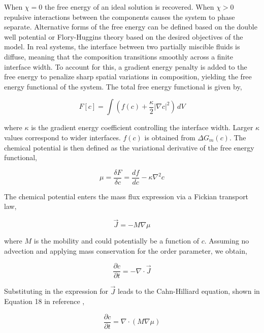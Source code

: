When $\chi = 0$ the free energy of an ideal solution is recovered. When $\chi > 0$ repulsive interactions between the components 
causes the system to phase separate. Alternative forms of the free energy can be defined based on the double well potential or
Flory-Huggins theory based on the desired objectives of the model. In real systems, the interface between two partially miscible fluids is 
diffuse, meaning that the composition transitions smoothly across a finite interface width. To account for this, a gradient energy penalty is 
added to the free energy to penalize sharp spatial variations in composition, yielding the free energy functional of the system. 
The total free energy functional is given by,

\begin{equation}
    F[c] = \int \left( f(c) + \frac{\kappa}{2}|\nabla c|^2 \right) \, dV
\end{equation}

where $\kappa$ is the gradient energy coefficient controlling the interface width. Larger \(\kappa\) values correspond to wider interfaces.
$f(c)$ is obtained from $\Delta G_m (c)$.
The chemical potential is then defined as the variational derivative of the free energy functional,

\begin{equation}
    \mu = \frac{\delta F}{\delta c} = \frac{df}{dc} - \kappa \nabla^2 c
\end{equation}

The chemical potential enters the mass flux expression via a Fickian transport law,

\begin{equation}
    \vec{J} = -M \nabla \mu
\end{equation}

where $M$ is the mobility and could potentially be a function of $c$. Assuming no advection and applying mass conservation for the order parameter, we obtain,

\begin{equation}
    \frac{\partial c}{\partial t} = -\nabla \cdot \vec{J}
\end{equation}

Substituting in the expression for \(\vec{J}\) leads to the Cahn-Hilliard equation, shown in Equation 18 in reference \cite{cahn_spinodal_1961},

\begin{equation}
    \frac{\partial c}{\partial t} = \nabla \cdot \left( M \nabla \mu \right)
\end{equation}

